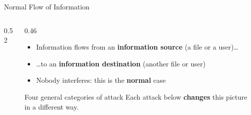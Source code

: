 \documentclass[aspectratio=169,11pt,xcolor={table}]{beamer}
\newcommand{\hl}[1]{\textcolor{ocean}{\textbf{#1}}}
\newcommand{\good}[1]{\textcolor{leaf}{\textbf{#1}}}
\begin{document}
\begin{frame}{Normal Flow of Information}
  \begin{columns}[c]
    \begin{column}{0.52\textwidth}
      \centering
    \end{column}
    \begin{column}{0.46\textwidth}
      \begin{itemize}\setlength{\itemsep}{6pt}
        \item Information flows from an \good{information source} (a file or a user)\dots
        \item \dots to an \hl{information destination} (another file or user)
        \item Nobody interferes: this is the \textbf{normal} case
      \end{itemize}
      \vspace{2mm}
      \begin{block}{Four general categories of attack}
        \small Each attack below \textbf{changes} this picture in a different way.
      \end{block}
    \end{column}
  \end{columns}
  \vspace{4mm}
  \centering
\end{frame}
\end{document}
